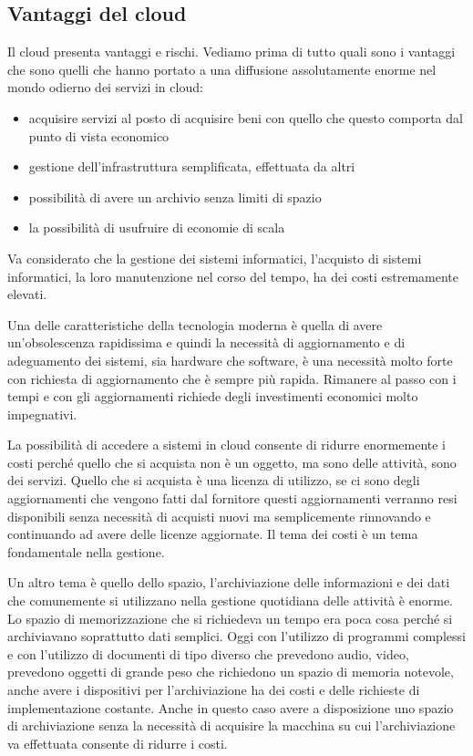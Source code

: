 \subsection{Vantaggi del cloud}
Il cloud presenta vantaggi e rischi. 
Vediamo prima di tutto quali sono i vantaggi che sono quelli che hanno portato a una diffusione assolutamente enorme nel mondo odierno dei servizi in cloud: 

\begin{itemize}
    \item acquisire servizi al posto di acquisire beni con quello che questo comporta dal punto di vista economico
    \item gestione dell'infrastruttura semplificata, effettuata da altri
    \item possibilità di avere un archivio senza limiti di spazio
    \item la possibilità di usufruire di economie di scala
\end{itemize}

Va considerato che la gestione dei sistemi informatici, l'acquisto di sistemi informatici, la loro manutenzione nel corso del tempo, ha dei costi estremamente elevati. 

Una delle caratteristiche della tecnologia moderna è quella di avere un'obsolescenza rapidissima e quindi la necessità di aggiornamento e di adeguamento dei sistemi, sia hardware che software, è una necessità molto forte con richiesta di aggiornamento che è sempre più rapida. Rimanere al passo con i tempi e con gli aggiornamenti richiede degli investimenti economici molto impegnativi. 

La possibilità di accedere a sistemi in cloud consente di ridurre enormemente i costi perché quello che si acquista non è un oggetto, ma sono delle attività, sono dei servizi. 
Quello che si acquista è una licenza di utilizzo, se ci sono degli aggiornamenti che vengono fatti dal fornitore questi aggiornamenti verranno resi disponibili senza necessità di acquisti nuovi ma semplicemente rinnovando e continuando ad avere delle licenze aggiornate. 
Il tema dei costi è un tema fondamentale nella gestione. 

Un altro tema è quello dello spazio, l'archiviazione delle informazioni e dei dati che comunemente si utilizzano nella gestione quotidiana delle attività è enorme. Lo spazio di memorizzazione che si richiedeva un tempo era poca cosa perché si archiviavano soprattutto dati semplici. Oggi con l'utilizzo di programmi complessi e con l'utilizzo di documenti di tipo diverso che prevedono audio, video, prevedono oggetti di grande peso che richiedono un spazio di memoria notevole, anche avere i dispositivi per l'archiviazione ha dei costi e delle richieste di implementazione costante. Anche in questo caso avere a disposizione uno spazio di archiviazione senza la necessità di acquisire la macchina su cui l'archiviazione va effettuata consente di ridurre i costi. 

